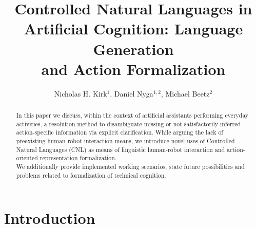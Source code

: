 \documentclass[oribibl]{llncs}
\begin{document}
%
\frontmatter          %
%
\pagestyle{headings}  %
\title{Controlled Natural Languages in\\ Artificial Cognition: Language Generation \\and Action Formalization}
%
\author{Nicholas H. Kirk$^1$, Daniel Nyga$^{1,2}$, Michael Beetz$^2$}
%
%
%
\maketitle              %
\begin{abstract}

In this paper we discuss, within the context of artificial assistants performing everyday activities, a resolution method to disambiguate missing or not satisfactorily inferred action-specific information via explicit clarification.
While arguing the lack of preexisting human-robot interaction means, 
we introduce novel uses of Controlled Natural Languages (CNL)
as means of linguistic human-robot interaction and action-oriented representation formalization.\\
We additionally provide implemented working scenarios, 
state future possibilities and problems related to formalization of technical cognition.

 \end{abstract}

\section{Introduction} 
\end{document}
